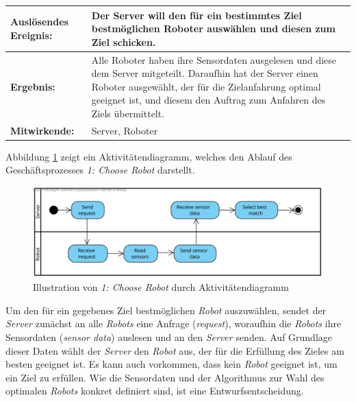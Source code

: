 			\begin{table}[H]
				\centering
				\begin{tabularx}{\textwidth}{|p{3cm}|X|}
				\hline
				\textbf{Auslösendes Ereignis:} & Der Server will den für ein bestimmtes Ziel bestmöglichen Roboter auswählen und diesen zum Ziel schicken. \\ \hline
				\textbf{Ergebnis:} & Alle Roboter haben ihre Sensordaten ausgelesen und diese dem Server
				mitgeteilt. 
				Daraufhin hat der Server einen Roboter ausgewählt, der für
				die Zielanfahrung optimal geeignet ist, und diesem den Auftrag zum
				Anfahren des Ziels übermittelt. \\ \hline
				\textbf{Mitwirkende:} &	Server, Roboter \\
				\hline
				\end{tabularx}
				\label{tab:2-4-choose-robot}
			\end{table}

			Abbildung \ref{fig:2-4-choose-robot-aktivitaetendiagramm} zeigt ein Aktivitätendiagramm, welches den Ablauf des Geschäftsprozesses \emph{1: Choose Robot} darstellt.
			\begin{figure}[H]
				\centering
				\includegraphics[width=\textwidth]{img/1-Analyse-3-Choose_Robot}
				\caption{Illustration von \emph{1: Choose Robot} durch Aktivitätendiagramm}
				\label{fig:2-4-choose-robot-aktivitaetendiagramm}
			\end{figure}

			Um den für ein gegebenes Ziel bestmöglichen \emph{Robot} auszuwählen, sendet
			der \emph{Server} zunächst an alle \emph{Robots} eine Anfrage (\emph{request}),
			woraufhin die \emph{Robots} ihre Sensordaten (\emph{sensor data}) auslesen und
			an den \emph{Server} senden. Auf Grundlage dieser Daten wählt der \emph{Server} den
			\emph{Robot} aus, der für die Erfüllung des Zieles am besten geeignet ist. 
			Es kann auch vorkommen, dass kein \emph{Robot} geeignet ist, um ein Ziel zu erfüllen. 
			Wie die Sensordaten und der Algorithmus zur Wahl des optimalen \emph{Robots} konkret definiert sind, ist eine Entwurfsentscheidung.

